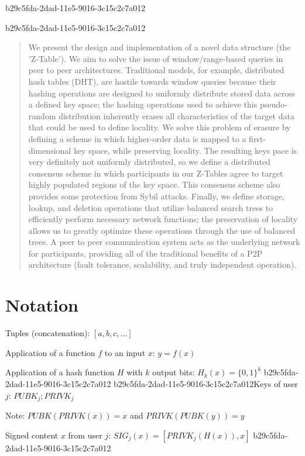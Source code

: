 \documentclass[12pt]{article}
\begin{document}
b29c5fda-2dad-11e5-9016-3c15c2c7a012
\maketitle
b29c5fda-2dad-11e5-9016-3c15c2c7a012
\begin{abstract}
We present the design and implementation of a novel data structure (the 'Z-Table'). We aim to solve the issue of window/range-based queries in peer to peer architectures. Traditional models, for example,  distributed hash tables (DHT), are hostile towards window queries because their hashing operations are designed to uniformly distribute stored data across a defined key space; the hashing operations used to achieve this pseudo-random distribution inherently erases all characteristics of the target data that could be used to define locality. We solve this problem of erasure by defining a scheme in which higher-order data is mapped to a first-dimensional key space, while preserving locality. The resulting keys pace is very definitely not uniformly distributed, so we define a distributed consensus scheme in which participants in our Z-Tables agree to target highly populated regions of the key space. This consensus scheme also provides some protection from Sybil attacks. Finally, we define storage, lookup, and deletion operations that utilize balanced search trees to efficiently perform necessary network functions; the preservation of locality allows us to greatly optimize these operations through the use of balanced trees. A peer to peer communication system acts as the underlying network for participants, providing all of the traditional benefits of a P2P architecture (fault tolerance, scalability, and truly independent operation).
\end{abstract}

\section{Notation}

Tuples (concatenation): $[a,b,c,...]$

Application of a function $f$ to an input $x$: $y=f(x)$

Application of a hash function $H$ with $k$ output bits: $H_{k}(x) = \{0,1\}^k$
b29c5fda-2dad-11e5-9016-3c15c2c7a012
b29c5fda-2dad-11e5-9016-3c15c2c7a012Keys of user $j$: $ PUBK_j; PRIVK_j $

Note: $PUBK(PRIVK(x)) = x$ and $PRIVK(PUBK(y)) = y$~

Signed content $x$ from user $j$: $SIG_j(x) = \left[ PRIVK_j( H(x) ), x \right]$
b29c5fda-2dad-11e5-9016-3c15c2c7a012
\end{document}
